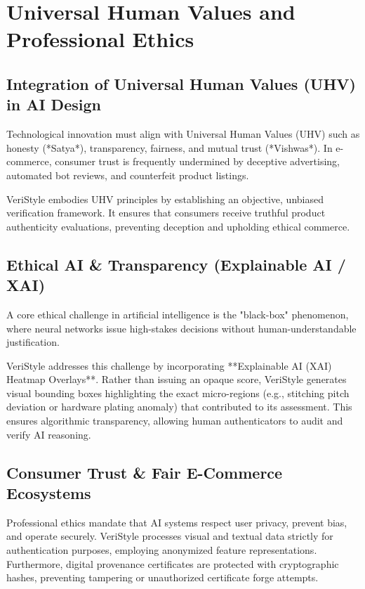 \chapter{Universal Human Values and Professional Ethics}

\section{Integration of Universal Human Values (UHV) in AI Design}
Technological innovation must align with Universal Human Values (UHV) such as honesty (*Satya*), transparency, fairness, and mutual trust (*Vishwas*). In e-commerce, consumer trust is frequently undermined by deceptive advertising, automated bot reviews, and counterfeit product listings.

VeriStyle embodies UHV principles by establishing an objective, unbiased verification framework. It ensures that consumers receive truthful product authenticity evaluations, preventing deception and upholding ethical commerce.

\section{Ethical AI & Transparency (Explainable AI / XAI)}
A core ethical challenge in artificial intelligence is the "black-box" phenomenon, where neural networks issue high-stakes decisions without human-understandable justification.

VeriStyle addresses this challenge by incorporating **Explainable AI (XAI) Heatmap Overlays**. Rather than issuing an opaque score, VeriStyle generates visual bounding boxes highlighting the exact micro-regions (e.g., stitching pitch deviation or hardware plating anomaly) that contributed to its assessment. This ensures algorithmic transparency, allowing human authenticators to audit and verify AI reasoning.

\section{Consumer Trust & Fair E-Commerce Ecosystems}
Professional ethics mandate that AI systems respect user privacy, prevent bias, and operate securely. VeriStyle processes visual and textual data strictly for authentication purposes, employing anonymized feature representations. Furthermore, digital provenance certificates are protected with cryptographic hashes, preventing tampering or unauthorized certificate forge attempts.
